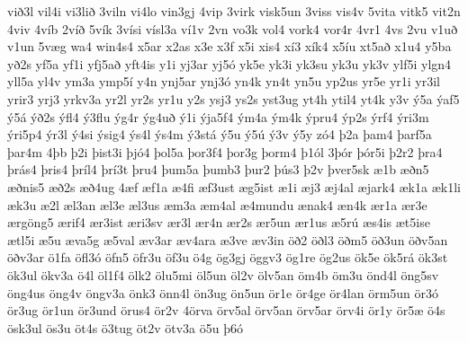 {við3l
vil4i
vi3lið
3viln
vi4lo
vin3gj
4vip
3virk
visk5un
3viss
vis4v
5vita
vitk5
vit2n
4viv
4víb
2víð
5vík
3vísi
vísl3a
ví1v
2vn
vo3k
vol4
vork4
vor4r
4vr1
4vs
2vu
v1uð
v1un
5væg
wa4
win4s4
x5ar
x2as
x3e
x3f
x5i
xis4
xí3
xík4
x5íu
xt5að
x1u4
y5ba
yð2s
yf5a
yf1i
yfj5að
yft4is
y1i
yj3ar
yj5ó
yk5e
yk3i
yk3su
yk3u
yk3v
ylf5i
ylgn4
yll5a
yl4v
ym3a
ymp5í
y4n
ynj5ar
ynj3ó
yn4k
yn4t
yn5u
yp2us
yr5e
yr1i
yr3il
yrir3
yrj3
yrkv3a
yr2l
yr2s
yr1u
y2s
ysj3
ys2s
yst3ug
yt4h
ytil4
yt4k
y3v
ý5a
ýaf5
ý5á
ýð2s
ýfl4
ý3flu
ýg4r
ýg4uð
ý1i
ýja5f4
ým4a
ým4k
ýpru4
ýp2s
ýrf4
ýri3m
ýri5p4
ýr3l
ý4si
ýsig4
ýs4l
ýs4m
ý3stá
ý5u
ý5ú
ý3v
ý5y
zó4
þ2a
þam4
þarf5a
þar4m
4þb
þ2i
þist3i
þjó4
þol5a
þor3f4
þor3g
þorm4
þ1ól
3þór
þór5i
þ2r2
þra4
þrás4
þris4
þríl4
þrí3t
þru4
þum5a
þumb3
þur2
þús3
þ2v
þver5sk
æ1b
æðn5
æðnis5
æð2s
æð4ug
4æf
æf1a
æ4fi
æf3ust
æg5ist
æ1i
æj3
æj4al
æjark4
æk1a
æk1li
æk3u
æ2l
æl3an
æl3e
æl3us
æm3a
æm4al
æ4mundu
ænak4
æn4k
ær1a
ær3e
ærgöng5
ærif4
ær3ist
æri3sv
ær3l
ær4n
ær2s
ær5un
ær1us
æ5rú
æs4is
æt5ise
ætl5i
æ5u
æva5g
æ5val
æv3ar
æv4ara
æ3ve
æv3in
öð2
öðl3
öðm5
öð3un
öðv5an
öðv3ar
ö1fa
öfl3ó
öfn5
öfr3u
öf3u
ö4g
ög3gj
öggv3
ög1re
ög2us
ök5e
ök5rá
ök3st
ök3ul
ökv3a
ö4l
öl1f4
ölk2
ölu5mi
öl5un
öl2v
ölv5an
öm4b
öm3u
önd4l
öng5sv
öng4us
öng4v
öngv3a
önk3
önn4l
ön3ug
ön5un
ör1e
ör4ge
ör4lan
örm5un
ör3ó
ör3ug
ör1un
ör3und
örus4
ör2v
4örva
örv5al
örv5an
örv5ar
örv4i
ör1y
ör5æ
ö4s
ösk3ul
ös3u
öt4s
ö3tug
öt2v
ötv3a
ö5u
þ6ó
}
